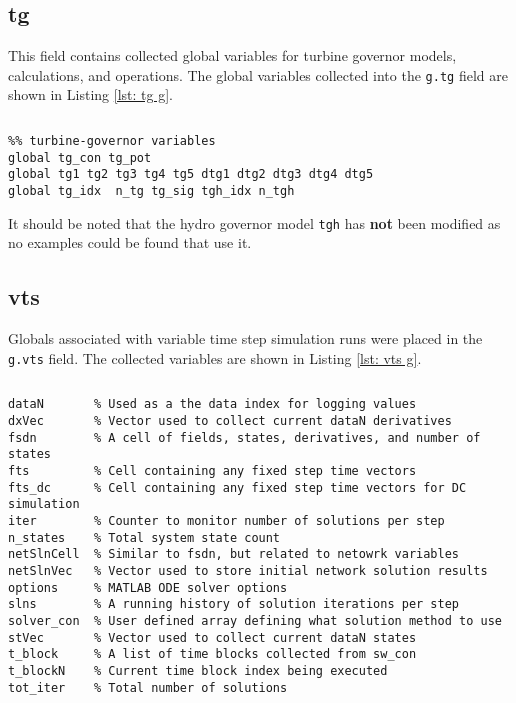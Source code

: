 
\pagebreak
\subsection{tg}
This field contains collected global variables for turbine governor models, calculations, and operations.
The global variables collected into the \verb|g.tg| field are shown in Listing \ref{lst: tg g}.

\begin{lstlisting}[caption={Turbine Governor Global Field Variables},label={lst: tg g}]
\end{lstlisting}\vspace{-2 em}
\begin{verbatim}
%% turbine-governor variables
global tg_con tg_pot
global tg1 tg2 tg3 tg4 tg5 dtg1 dtg2 dtg3 dtg4 dtg5
global tg_idx  n_tg tg_sig tgh_idx n_tgh
\end{verbatim}

\noindent It should be noted that the hydro governor model \verb|tgh| has \textbf{not} been modified as no examples could be found that use it.

\subsection{vts}  
Globals associated with variable time step simulation runs were placed in the \verb|g.vts| field.
The collected variables are shown in Listing \ref{lst: vts g}.

\begin{lstlisting}[caption={VTS Global Field Variables},label={lst: vts g}]
\end{lstlisting}\vspace{-2 em}
\begin{verbatim}
dataN       % Used as a the data index for logging values
dxVec       % Vector used to collect current dataN derivatives
fsdn        % A cell of fields, states, derivatives, and number of states
fts         % Cell containing any fixed step time vectors
fts_dc      % Cell containing any fixed step time vectors for DC simulation
iter        % Counter to monitor number of solutions per step
n_states    % Total system state count
netSlnCell  % Similar to fsdn, but related to netowrk variables
netSlnVec   % Vector used to store initial network solution results
options     % MATLAB ODE solver options
slns        % A running history of solution iterations per step
solver_con  % User defined array defining what solution method to use
stVec       % Vector used to collect current dataN states
t_block     % A list of time blocks collected from sw_con
t_blockN    % Current time block index being executed
tot_iter    % Total number of solutions
\end{verbatim}

